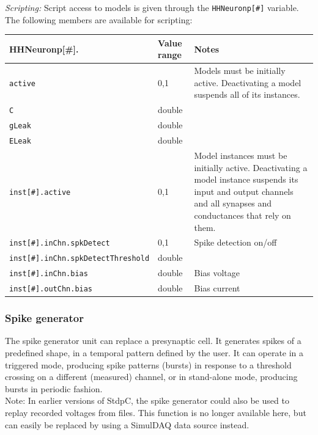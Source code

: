 \documentclass{article}
\begin{document}
\noindent
\emph{Scripting:} Script access to models is given through the \texttt{HHNeuronp[\#]} variable.
The following members are available for scripting: \\
\begin{tabularx}{\linewidth}{|ll|X|}
	\hline
	{\bf HHNeuronp[\#].\textvisiblespace} & {\bf Value range} & {\bf Notes} \\
	\hline
	\texttt{active} & 0,1 & Models must be initially active. Deactivating a model suspends all of
	its instances. \\
	\texttt{C} & double & \\
	\texttt{gLeak} & double & \\
	\texttt{ELeak} & double & \\
	\texttt{inst[\#].active} & 0,1 & Model instances must be initially active. Deactivating a model instance
	suspends its input and output channels and all synapses and conductances that rely on them. \\
	\texttt{inst[\#].inChn.spkDetect} & 0,1 & Spike detection on/off \\
	\texttt{inst[\#].inChn.spkDetectThreshold} & double & \\
	\texttt{inst[\#].inChn.bias} & double & Bias voltage \\
	\texttt{inst[\#].outChn.bias} & double & Bias current \\
	\hline
\end{tabularx}

\subsubsection{Spike generator} \label{spikegen}
The spike generator unit can replace a presynaptic cell. It generates spikes of a 
predefined shape, in a temporal pattern defined by the user. It can operate in
a triggered mode, producing spike patterns (bursts) in response to a threshold crossing
on a different (measured) channel, or in stand-alone mode, producing bursts in
periodic fashion. \\
Note: In earlier versions of StdpC, the spike generator could also be used to
replay recorded voltages from files. This function is no longer available
here, but can easily be replaced by using a SimulDAQ data source instead.\\
\end{document}
